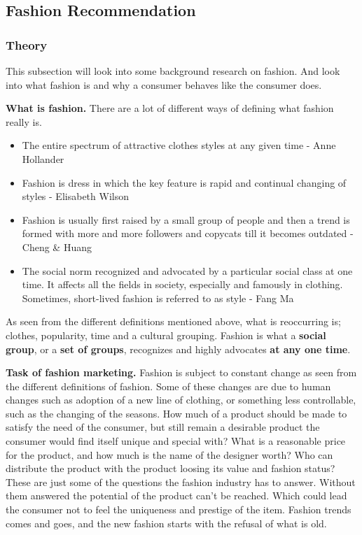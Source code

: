 
\subsection{Fashion Recommendation}

\subsubsection{Theory}
This subsection will look into some background research on fashion.
And look into what fashion is and why a consumer behaves like the consumer does.

\textbf{What is fashion.}
There are a lot of different ways of defining what fashion really is.

\begin{itemize}
    \item The entire spectrum of attractive clothes styles at any given time - Anne Hollander
    \item Fashion is dress in which the key feature is rapid and continual changing of styles - Elisabeth Wilson
    \item Fashion is usually first raised by a small group of people and then a trend is formed with more and more followers and copycats till it becomes outdated - Cheng \& Huang
    \item The social norm recognized and advocated by a particular social class at one
    time. It affects all the fields in society, especially and famously in
    clothing. Sometimes, short-lived fashion is referred to as style - Fang Ma \cite{Fang2012}
\end{itemize}

As seen from the different definitions mentioned above, what is reoccurring is;
clothes, popularity, time and a cultural grouping. Fashion is what a \textbf{social group}, or a \textbf{set of groups}, recognizes and highly advocates \textbf{at any one time}.

\textbf{Task of fashion marketing.}
Fashion is subject to constant change as seen from the different definitions of fashion.
Some of these changes are due to human changes such as adoption of a new line of clothing, or something less controllable, such as the changing of the seasons.
How much of a product should be made to satisfy the need of the consumer, but still remain a desirable product the consumer would find itself unique and special with?
What is a reasonable price for the product, and how much is the name of the designer worth?
Who can distribute the product with the product loosing its value and fashion status?
These are just some of the questions the fashion industry has to answer.
Without them answered the potential of the product can't be reached.
Which could lead the consumer not to feel the uniqueness and prestige of the item.
Fashion trends comes and goes, and the new fashion starts with the refusal of what is old.

